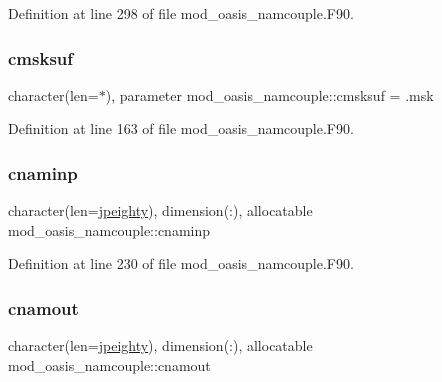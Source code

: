 Definition at line 298 of file mod\+\_\+oasis\+\_\+namcouple.\+F90.

\mbox{\label{namespacemod__oasis__namcouple_aea73257d04086fa6a1ddff0baa72cb34}} 
\subsubsection{\texorpdfstring{cmsksuf}{cmsksuf}}
{\footnotesize\ttfamily character(len=$\ast$), parameter mod\+\_\+oasis\+\_\+namcouple\+::cmsksuf = \textquotesingle{}.msk\textquotesingle{}\hspace{0.3cm}{\ttfamily [private]}}



Definition at line 163 of file mod\+\_\+oasis\+\_\+namcouple.\+F90.

\mbox{\label{namespacemod__oasis__namcouple_a1f6ff08cee0c3c5deb262c1447d88328}} 
\subsubsection{\texorpdfstring{cnaminp}{cnaminp}}
{\footnotesize\ttfamily character(len=\hyperlink{namespacemod__oasis__namcouple_a4fb10ad6e864dcbe34c4a8b02204a523}{jpeighty}), dimension(\+:), allocatable mod\+\_\+oasis\+\_\+namcouple\+::cnaminp\hspace{0.3cm}{\ttfamily [private]}}



Definition at line 230 of file mod\+\_\+oasis\+\_\+namcouple.\+F90.

\mbox{\label{namespacemod__oasis__namcouple_a71ba84b9a7a813ca2551bcde99a0b5b5}} 
\subsubsection{\texorpdfstring{cnamout}{cnamout}}
{\footnotesize\ttfamily character(len=\hyperlink{namespacemod__oasis__namcouple_a4fb10ad6e864dcbe34c4a8b02204a523}{jpeighty}), dimension(\+:), allocatable mod\+\_\+oasis\+\_\+namcouple\+::cnamout\hspace{0.3cm}{\ttfamily [private]}}



